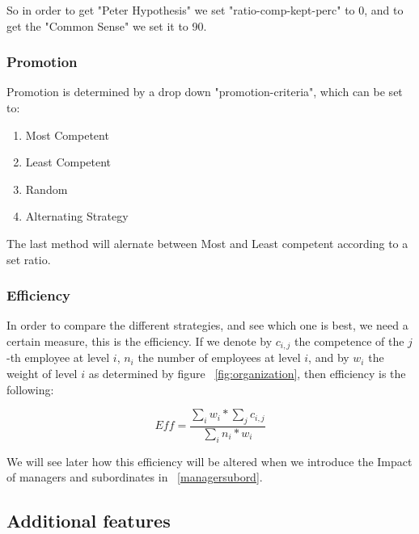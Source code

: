 \documentclass[11pt]{article}
\begin{document}
So in order to get "Peter Hypothesis" we set "ratio-comp-kept-perc" to 0, and to get the "Common Sense" we set it to 90.

\subsubsection{Promotion}
Promotion is determined by a drop down "promotion-criteria", which can be set to:

\begin{enumerate}
\item Most Competent
\item Least Competent
\item Random
\item Alternating Strategy
\end{enumerate}

The last method will alernate between Most and Least competent according to a set ratio.

\subsubsection{Efficiency}
In order to compare the different strategies, and see which one is best, we need a certain measure, this is the efficiency. If we denote by $c_{i,j}$ the competence of the $j$-th employee at level $i$, $n_i$ the number of employees at level $i$, and by $w_i$ the weight of level $i$ as determined by figure ~\ref{fig:organization}, then efficiency is the following:

\begin{equation}
\label{eq:efficiency}
Eff = \frac{\sum_i w_i * \sum_j c_{i,j}}{\sum_i n_i * w_i}
\end{equation}

We will see later how this efficiency will be altered when we introduce the Impact of managers and subordinates in ~\ref{managersubord}.

\subsection{Additional features}
\label{additional}
\end{document}
